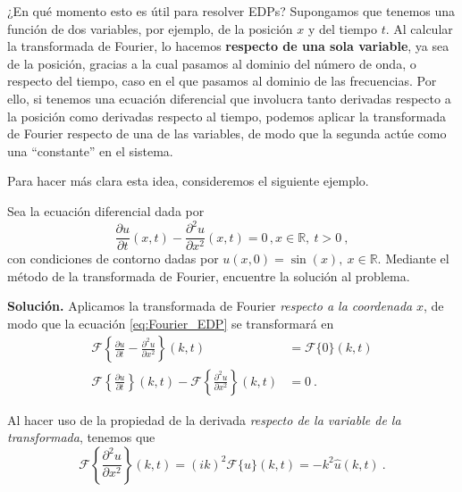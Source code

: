 ¿En qué momento esto es útil para resolver EDPs? Supongamos que tenemos una función de dos variables, por ejemplo, de la posición $x$ y del tiempo $t$. Al calcular la transformada de Fourier, lo hacemos \textbf{respecto de una sola variable}, ya sea de la posición, gracias a la cual pasamos al dominio del número de onda, o respecto del tiempo, caso en el que pasamos al dominio de las frecuencias. Por ello, si tenemos una ecuación diferencial que involucra tanto derivadas respecto a la posición como derivadas respecto al tiempo, podemos aplicar la transformada de Fourier respecto de una de las variables, de modo que la segunda actúe como una ``constante'' en el sistema.

Para hacer más clara esta idea, consideremos el siguiente ejemplo.

\begin{ejemplo}
    Sea la ecuación diferencial dada por
    \begin{equation} \label{eq:Fourier_EDP}
        \frac{\partial u}{\partial t} (x,t) - \frac{\partial^2 u}{\partial x^2}(x,t) = 0 \, , x \in \mathbb{R}, \ t>0 \ ,
    \end{equation}
    con condiciones de contorno dadas por $u(x,0) = \sin(x), \ x \in \mathbb{R}$. Mediante el método de la transformada de Fourier, encuentre la solución al problema.
    
    \textbf{Solución.} Aplicamos la transformada de Fourier \emph{respecto a la coordenada} $x$, de modo que la ecuación \eqref{eq:Fourier_EDP} se transformará en
    \begin{align}
        \mathcal{F}\left\{ \frac{\partial u}{\partial t} - \frac{\partial^2 u}{\partial x^2} \right\}(k, t) & = \mathcal{F}\{0\}(k,t) \\
        \mathcal{F}\left\{ \frac{\partial u}{\partial t} \right\}(k, t) - \mathcal{F}\left\{ \frac{\partial^2 u}{\partial x^2} \right\}(k, t) & = 0 \ .
    \end{align}

    Al hacer uso de la propiedad de la derivada \emph{respecto de la variable de la transformada}, tenemos que
    \begin{equation}
        \mathcal{F}\left\{ \frac{\partial^2 u}{\partial x^2} \right\}(k, t) = (ik)^2 \mathcal{F}\{u\}(k,t) = -k^2 \hat{u}(k,t) \ .
    \end{equation}
\end{ejemplo}